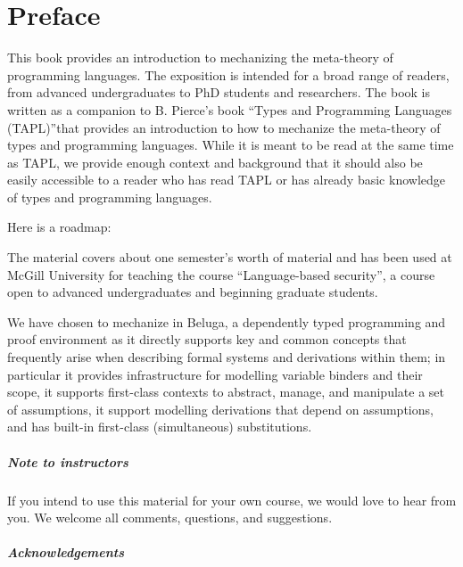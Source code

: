 \chapter*{Preface}
This book provides an introduction to mechanizing the meta-theory of programming languages. The exposition is intended for a broad range of readers, from advanced undergraduates to PhD students and researchers.  The book is written as a companion to B. Pierce's book ``Types and Programming Languages (TAPL)''that provides an introduction to how to mechanize the meta-theory of types and programming languages. While it is meant to be read  at the same time as TAPL, we provide enough context and background that it should also be easily accessible to a reader who has read TAPL or has already basic knowledge of types and programming languages. 

Here is a roadmap:


The material covers about one semester's worth of material and has been used at McGill University for teaching the course ``Language-based security'', a course open to advanced undergraduates and beginning graduate students. 


We have chosen to mechanize in Beluga, a dependently typed programming and proof environment as it directly supports key and common concepts that frequently arise when describing formal systems and derivations within them; in particular it provides infrastructure for modelling variable binders and their scope, it supports first-class contexts to abstract, manage, and manipulate a set of assumptions, it support modelling derivations that depend on assumptions, and has built-in first-class (simultaneous) substitutions.  


\paragraph{Note to instructors}
If you intend to use this material for your own course, we would love to hear from you. We welcome all comments, questions, and suggestions.

\paragraph{Acknowledgements}